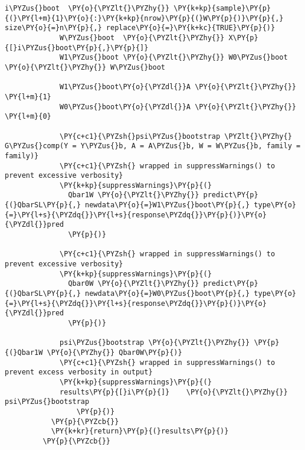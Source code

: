 \begin{Verbatim}[commandchars=\\\{\}]
             i\PYZus{}boot  \PY{o}{\PYZlt{}\PYZhy{}} \PY{k+kp}{sample}\PY{p}{(}\PY{l+m}{1}\PY{o}{:}\PY{k+kp}{nrow}\PY{p}{(}W\PY{p}{)}\PY{p}{,} size\PY{o}{=}n\PY{p}{,} replace\PY{o}{=}\PY{k+kc}{TRUE}\PY{p}{)}
             W\PYZus{}boot  \PY{o}{\PYZlt{}\PYZhy{}} X\PY{p}{[}i\PYZus{}boot\PY{p}{,}\PY{p}{]}
             W1\PYZus{}boot \PY{o}{\PYZlt{}\PYZhy{}} W0\PYZus{}boot \PY{o}{\PYZlt{}\PYZhy{}} W\PYZus{}boot
         
             W1\PYZus{}boot\PY{o}{\PYZdl{}}A \PY{o}{\PYZlt{}\PYZhy{}} \PY{l+m}{1}
             W0\PYZus{}boot\PY{o}{\PYZdl{}}A \PY{o}{\PYZlt{}\PYZhy{}} \PY{l+m}{0}  
               
             \PY{c+c1}{\PYZsh{}psi\PYZus{}bootstrap \PYZlt{}\PYZhy{} G\PYZus{}comp(Y = Y\PYZus{}b, A = A\PYZus{}b, W = W\PYZus{}b, family = family)}
             \PY{c+c1}{\PYZsh{} wrapped in suppressWarnings() to prevent excessive verbosity}
             \PY{k+kp}{suppressWarnings}\PY{p}{(}
               Qbar1W \PY{o}{\PYZlt{}\PYZhy{}} predict\PY{p}{(}QbarSL\PY{p}{,} newdata\PY{o}{=}W1\PYZus{}boot\PY{p}{,} type\PY{o}{=}\PY{l+s}{\PYZdq{}}\PY{l+s}{response\PYZdq{}}\PY{p}{)}\PY{o}{\PYZdl{}}pred
               \PY{p}{)} 
         
             \PY{c+c1}{\PYZsh{} wrapped in suppressWarnings() to prevent excessive verbosity}
             \PY{k+kp}{suppressWarnings}\PY{p}{(}
               Qbar0W \PY{o}{\PYZlt{}\PYZhy{}} predict\PY{p}{(}QbarSL\PY{p}{,} newdata\PY{o}{=}W0\PYZus{}boot\PY{p}{,} type\PY{o}{=}\PY{l+s}{\PYZdq{}}\PY{l+s}{response\PYZdq{}}\PY{p}{)}\PY{o}{\PYZdl{}}pred
               \PY{p}{)} 
         
             psi\PYZus{}bootstrap \PY{o}{\PYZlt{}\PYZhy{}} \PY{p}{(}Qbar1W \PY{o}{\PYZhy{}} Qbar0W\PY{p}{)}
             \PY{c+c1}{\PYZsh{} wrapped in suppressWarnings() to prevent excess verbosity in output}
             \PY{k+kp}{suppressWarnings}\PY{p}{(}
             results\PY{p}{[}i\PY{p}{]}    \PY{o}{\PYZlt{}\PYZhy{}} psi\PYZus{}bootstrap
                 \PY{p}{)}
           \PY{p}{\PYZcb{}}
           \PY{k+kr}{return}\PY{p}{(}results\PY{p}{)}
         \PY{p}{\PYZcb{}}
\end{Verbatim}


